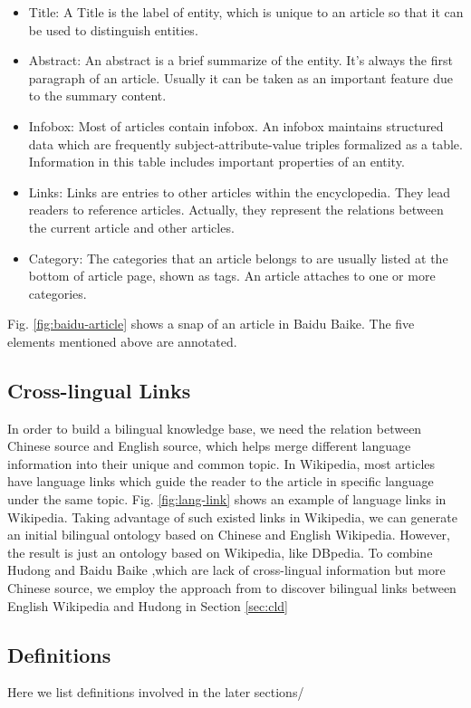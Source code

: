 \documentclass[runningheads,a4paper]{llncs}
\begin{document}
\begin{itemize}
  \item Title: A Title is the label of entity, which is unique to an article so that it can be used to distinguish entities.
  \item Abstract: An abstract is a brief summarize of the entity. It's always the first paragraph of an article. Usually it can be taken as an important feature due to the summary content. 
  \item Infobox: Most of articles contain infobox. An infobox maintains structured data which are frequently subject-attribute-value triples formalized as a table. Information in this table includes important properties of an entity.
  \item Links: Links are entries to other articles within the encyclopedia. They lead readers to reference articles. Actually, they represent the relations between the current article and other articles.
  \item Category: The categories that an article belongs to are usually listed at the bottom of article page, shown as tags. An article attaches to one or more categories.
\end{itemize}
Fig. \ref{fig:baidu-article} shows a snap of an article in Baidu Baike. The five elements mentioned above are annotated.

\subsection{Cross-lingual Links}
In order to build a bilingual knowledge base, we need the relation between Chinese source and English source, which helps merge different language information into their unique and common topic. In Wikipedia, most articles have language links which guide the reader to the article in specific language under the same topic. Fig. \ref{fig:lang-link} shows an example of language links in Wikipedia. Taking advantage of such existed links in Wikipedia, we can generate an initial bilingual ontology based on Chinese and English Wikipedia. However, the result is just an ontology based on Wikipedia, like DBpedia. To combine Hudong and Baidu Baike ,which are lack of cross-lingual information but more Chinese source, we employ the approach from \cite{} to discover bilingual links between English Wikipedia and Hudong in Section \ref{sec:cld}  

\subsection{Definitions}
Here we list definitions involved in the later sections/
\end{document}
